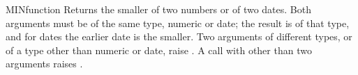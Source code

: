\begin{XbaseEntry}{MIN}{function}
Returns the smaller of two numbers or of two dates.
\Syntax
{}
\Usage
Both arguments must be of the same type, numeric or date; the result is of that type, and for dates the earlier date is the smaller. Two arguments of different types, or of a type other than numeric or date, raise . A call with other than two arguments raises .
\Examples
{}
\end{XbaseEntry}

